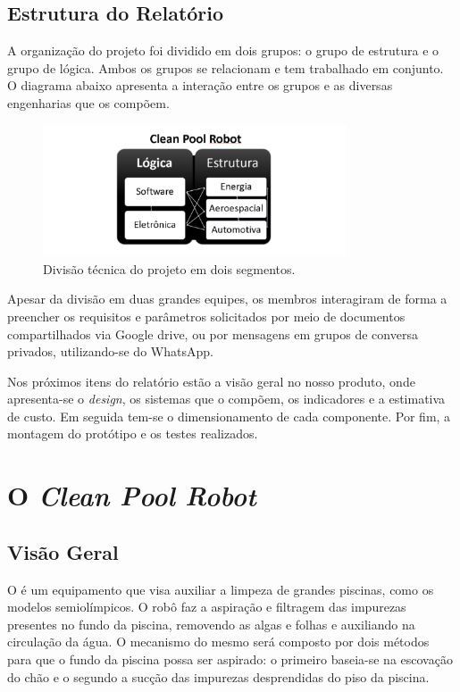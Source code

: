 \section{Estrutura do Relatório}
A organização do projeto foi dividido em dois grupos: o grupo de estrutura e o grupo de lógica. Ambos os grupos se relacionam e tem trabalhado em conjunto. O diagrama abaixo apresenta a interação entre os grupos e as diversas engenharias que os compõem.
\par
  \begin{figure}[h]
    \centering
    \includegraphics[width=0.8\textwidth]{figures/technical-div-project.png}
    \caption{Divisão técnica do projeto em dois segmentos.}
    \label{fig:technical-div-project}
  \end{figure}
  \FloatBarrier
\par
Apesar da divisão em duas grandes equipes, os membros interagiram de forma a preencher os requisitos e parâmetros solicitados por meio de documentos compartilhados via Google drive, ou por mensagens em grupos de conversa privados, utilizando-se do \textsf{WhatsApp}.

Nos próximos itens do relatório estão a visão geral no nosso produto, onde apresenta-se o \textit{design}, os sistemas que o compõem, os indicadores e a estimativa de custo. Em seguida tem-se o dimensionamento de cada componente. Por fim, a montagem do protótipo e os testes realizados.

\chapter{O \textit{Clean Pool Robot}}
\section{Visão Geral}
O \cpr é um equipamento que visa auxiliar a limpeza de grandes piscinas, como os modelos semiolímpicos. O robô faz a aspiração e filtragem das impurezas presentes no fundo da piscina, removendo as algas e folhas e auxiliando na circulação da água. O mecanismo do mesmo será composto por dois métodos para que o fundo da piscina possa ser aspirado: o primeiro baseia-se na escovação do chão e o segundo a sucção das impurezas desprendidas do piso da piscina.

